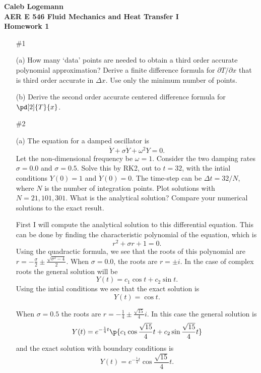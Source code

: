 \documentclass[11pt, oneside]{article}
\begin{document}
\noindent \textbf{\Large{Caleb Logemann \\
AER E 546 Fluid Mechanics and Heat Transfer I \\
Homework 1
}}

%
\begin{enumerate}
  \item[\#1]
    \item[(a)]
      How many `data' points are needed to obtain a third order accurate
      polynomial approximation?
      Derive a finite difference formula for $\partial T/\partial x$ that is
      third order accurate in $\Delta x$.
      Use only the minimum number of points.


    \item[(b)]
      Derive the second order accurate centered difference formula for
      $\pd[2]{T}{x}$.

  \item[\#2]
    \item[(a)]
      The equation for a damped oscillator is
      \[
        \ddot{Y} + \sigma \dot{Y} + \omega^2 Y = 0.
      \]
      Let the non-dimensional frequency be $\omega = 1$.
      Consider the two damping rates $\sigma=0.0$ and $\sigma=0.5$.
      Solve this by RK2, out to $t = 32$, with the intial conditions $Y(0) = 1$
      and $\dot{Y}(0) = 0$.
      The time-step can be $\Delta t = 32/N$, where $N$ is the number of
      integration points.
      Plot solutions with $N = 21, 101, 301$.
      What is the analytical solution?
      Compare your numerical solutions to the exact result.

      First I will compute the analytical solution to this differential
      equation.
      This can be done by finding the characteristic polynomial of the equation,
      which is
      \[
        r^2 + \sigma r + 1 = 0.
      \]
      Using the quadractic formula, we see that the roots of this polynomial
      are $r = -\frac{\sigma}{2} \pm \frac{\sqrt{\sigma^2 - 4}}{2}$.
      When $\sigma = 0.0$, the roots are $r = \pm i$.
      In the case of complex roots the general solution will be
      \[
        Y(t) = c_1 \cos{t} + c_2 \sin{t}.
      \]
      Using the intial conditions we see that the exact solution is
      \[
        Y(t) = \cos{t}.
      \]

      When $\sigma = 0.5$ the roots are $r = -\frac{1}{4} \pm \frac{\sqrt{15}}{4} i$.
      In this case the general solution is
      \[
        Y(t) = e^{-\frac{1}{4}t} \p{c_1 \cos{\frac{\sqrt{15}}{4} t} + c_2 \sin{\frac{\sqrt{15}}{4} t}}
      \]
      and the exact solution with boundary conditions is
      \[
        Y(t) = e^{-\frac{1}{4}t} \cos{\frac{\sqrt{15}}{4} t}.
      \]


\end{enumerate}
\end{document}
